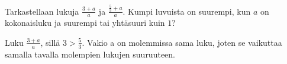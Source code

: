 \begin{tehtavasivu}
\begin{tehtava}
            \begin{vastaus}
            \end{vastaus}
\end{tehtava}

\begin{tehtava}
            \begin{vastaus}		
            \end{vastaus}
\end{tehtava}
        
\begin{tehtava} 
            \begin{vastaus}		
            \end{vastaus}
\end{tehtava}
        
\begin{tehtava}
	\begin{vastaus}
	\end{vastaus}
\end{tehtava}
    
\begin{tehtava}
 Tarkastellaan lukuja $\frac{3+a}{a}$ ja $\frac{\frac{5}{3}+a}{a}$. Kumpi luvuista on suurempi, kun $a$ on kokonaisluku ja suurempi tai yhtäsuuri kuin $1$?
 \begin{vastaus}
  Luku $\frac{3+a}{a}$, sillä $3>\frac{5}{3}$. Vakio a on molemmissa sama luku, joten se vaikuttaa samalla tavalla molempien lukujen suuruuteen.
 \end{vastaus}
\end{tehtava}


\end{tehtavasivu}
